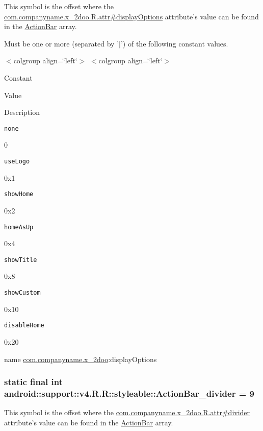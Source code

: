 This symbol is the offset where the \hyperlink{classcom_1_1companyname_1_1x__2doo_1_1_r_1_1attr_6fefabe23ed61c906c80592b44af3092}{com.companyname.x\_\-2doo.R.attr\#displayOptions} attribute's value can be found in the \hyperlink{classandroid_1_1support_1_1v4_1_1_r_1_1styleable_5c6cf2c83551ebae05f365bb913fdddf}{ActionBar} array.

Must be one or more (separated by '$|$') of the following constant values. \begin{TabularC}{0}
\hline
\end{TabularC}
$<$colgroup align=\char`\"{}left\char`\"{}$>$ $<$colgroup align=\char`\"{}left\char`\"{}$>$ 

Constant

Value

Description 

{\tt none}

0

{\tt useLogo}

0x1

{\tt showHome}

0x2

{\tt homeAsUp}

0x4

{\tt showTitle}

0x8

{\tt showCustom}

0x10

{\tt disableHome}

0x20

name \hyperlink{namespacecom_1_1companyname_1_1x__2doo}{com.companyname.x\_\-2doo}:displayOptions \hypertarget{classandroid_1_1support_1_1v4_1_1_r_1_1styleable_d827f43a76e4f9b7a6f0459ff2a4b5b8}{
\subsubsection[{ActionBar\_\-divider}]{\setlength{\rightskip}{0pt plus 5cm}static final int android::support::v4.R.R::styleable::ActionBar\_\-divider = 9}}
\label{classandroid_1_1support_1_1v4_1_1_r_1_1styleable_d827f43a76e4f9b7a6f0459ff2a4b5b8}


This symbol is the offset where the \hyperlink{classcom_1_1companyname_1_1x__2doo_1_1_r_1_1attr_3c36e19f15695ee78d2af0600da21466}{com.companyname.x\_\-2doo.R.attr\#divider} attribute's value can be found in the \hyperlink{classandroid_1_1support_1_1v4_1_1_r_1_1styleable_5c6cf2c83551ebae05f365bb913fdddf}{ActionBar} array.

